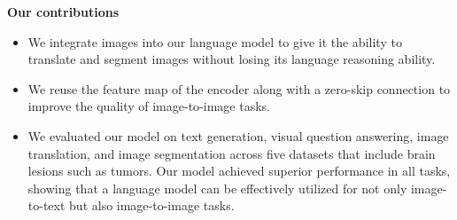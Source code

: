 \noindent \textbf{Our contributions}
\begin{itemize}[noitemsep, topsep=0pt, partopsep=0pt, parsep=0pt]
    \item[1.] We integrate images into our language model to give it the ability to translate and segment images without losing its language reasoning ability. 
    \item[2.] We reuse the feature map of the encoder along with a zero-skip connection to improve the quality of image-to-image tasks.
    \item[3.] We evaluated our model on text generation, visual question answering, image translation, and image segmentation across five datasets that include brain lesions such as tumors. Our model achieved superior performance in all tasks, showing that a language model can be effectively utilized for not only image-to-text but also image-to-image tasks.
\end{itemize}
